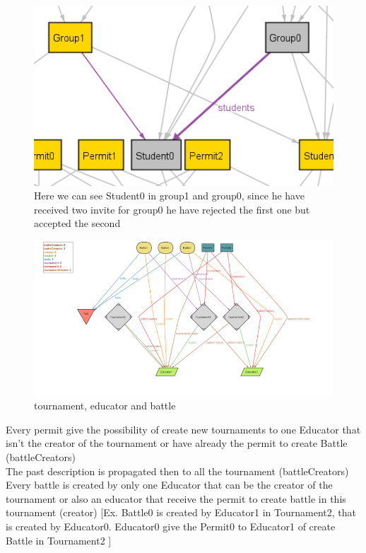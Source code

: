 \documentclass{article}
\begin{document}
{\begin{figure}[H]
\end{figure}
\begin{figure}[H]
    \centering
    \includegraphics{images/ALLOY/students.png}
    \caption{Here we can see Student0 in group1 and group0, since he have received two invite for group0 he have rejected the first one but accepted the second}
    \label{fig:receiving invite}
\end{figure}
\begin{figure}[H]
    \centering
    \hspace*{-3cm}\includegraphics[scale=1.3]{images/ALLOY/Picture2.png}
    \caption{tournament, educator and battle}
    \label{fig:tournament, educator and battle}
\end{figure}
\color{red}
Every permit give the possibility of create new tournaments to one Educator that isn't the creator of the tournament or have already the permit to create Battle (battleCreators)\\
\color{brown}
The past description is propagated then to all the tournament (battleCreators)\\
\color{orange}
Every battle is created by only one Educator that can be the creator of the tournament or also an educator that receive the permit to create battle in this tournament (creator) [Ex. Battle0 is created by Educator1 in Tournament2, that is created by Educator0. Educator0 give the Permit0 to Educator1 of create Battle in Tournament2 ]\\
}
\end{document}
